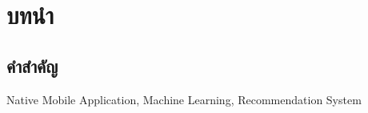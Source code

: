 \documentclass[14pt,oneside,openright,a4paper]{cpe-thai-project}
\begin{document}




\chapter{บทนำ}

\section{คำสำคัญ}

Native Mobile Application, Machine Learning, Recommendation System
\end{document}
